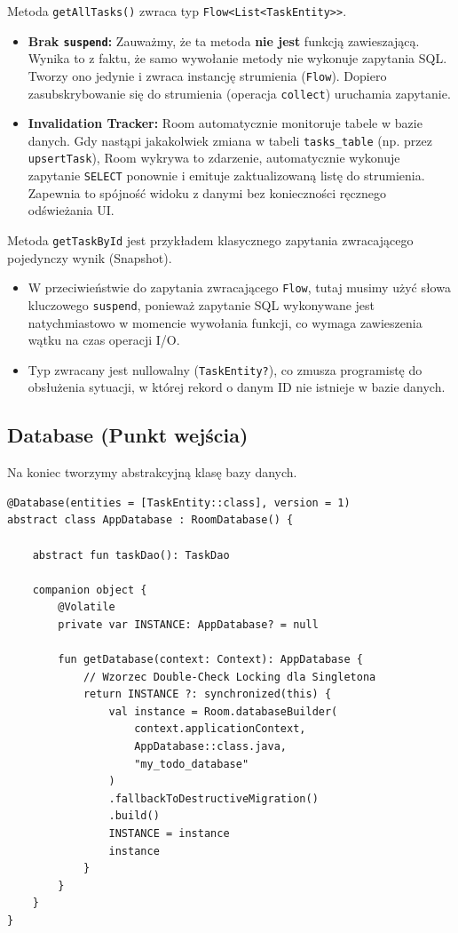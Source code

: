 Metoda \texttt{getAllTasks()} zwraca typ \texttt{Flow<List<TaskEntity>>}.

\begin{itemize}
    \item \textbf{Brak \texttt{suspend}:} Zauważmy, że ta metoda \textbf{nie jest} funkcją zawieszającą. Wynika to z faktu, że samo wywołanie metody nie wykonuje zapytania SQL. Tworzy ono jedynie i zwraca instancję strumienia (\texttt{Flow}). Dopiero zasubskrybowanie się do strumienia (operacja \texttt{collect}) uruchamia zapytanie.
    \item \textbf{Invalidation Tracker:} Room automatycznie monitoruje tabele w bazie danych. Gdy nastąpi jakakolwiek zmiana w tabeli \texttt{tasks\_table} (np. przez \texttt{upsertTask}), Room wykrywa to zdarzenie, automatycznie wykonuje zapytanie \texttt{SELECT} ponownie i emituje zaktualizowaną listę do strumienia. Zapewnia to spójność widoku z danymi bez konieczności ręcznego odświeżania UI.
\end{itemize}

Metoda \texttt{getTaskById} jest przykładem klasycznego zapytania zwracającego pojedynczy wynik (Snapshot).

\begin{itemize}
    \item W przeciwieństwie do zapytania zwracającego \texttt{Flow}, tutaj musimy użyć słowa kluczowego \texttt{suspend}, ponieważ zapytanie SQL wykonywane jest natychmiastowo w momencie wywołania funkcji, co wymaga zawieszenia wątku na czas operacji I/O.
    \item Typ zwracany jest nullowalny (\texttt{TaskEntity?}), co zmusza programistę do obsłużenia sytuacji, w której rekord o danym ID nie istnieje w bazie danych.
\end{itemize}

\subsection{Database (Punkt wejścia)}

Na koniec tworzymy abstrakcyjną klasę bazy danych.

\begin{verbatim}
@Database(entities = [TaskEntity::class], version = 1)
abstract class AppDatabase : RoomDatabase() {
    
    abstract fun taskDao(): TaskDao

    companion object {
        @Volatile
        private var INSTANCE: AppDatabase? = null

        fun getDatabase(context: Context): AppDatabase {
            // Wzorzec Double-Check Locking dla Singletona
            return INSTANCE ?: synchronized(this) {
                val instance = Room.databaseBuilder(
                    context.applicationContext,
                    AppDatabase::class.java,
                    "my_todo_database"
                )
                .fallbackToDestructiveMigration() 
                .build()
                INSTANCE = instance
                instance
            }
        }
    }
}
\end{verbatim}

